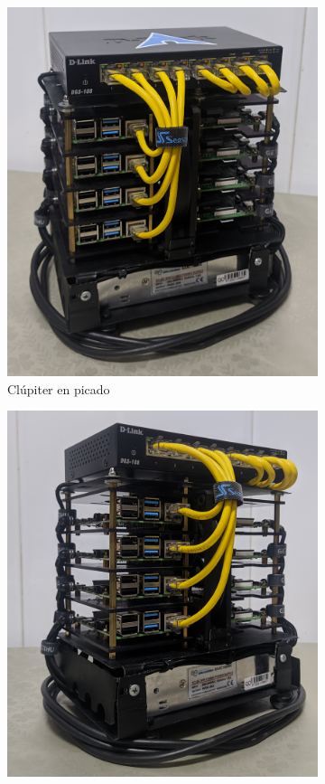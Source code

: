 \begin{figure}[H]
    \centering
    \begin{subfigure}[c]{0.45\textwidth}
        \includegraphics[width=\textwidth]{img/top.jpg}
        \caption{Clúpiter en picado}
        \label{fig:fotos_estructura_top}
    \end{subfigure}
    \begin{subfigure}[c]{0.45\textwidth}
        \includegraphics[width=\textwidth]{img/bottom.jpg}

\end{subfigure}
\end{figure}
